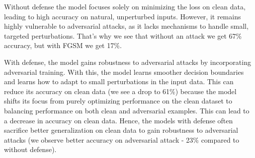 \documentclass{article}
\begin{document}

Without defense the model focuses solely on minimizing the loss on clean data, leading to high accuracy on natural,
unperturbed inputs. However, it remains highly vulnerable to adversarial attacks, as it lacks mechanisms to handle small, targeted perturbations. That's why we see that without an attack we get 67\% accuracy, but with FGSM we get 17\%.

With defense, the model gains robustness to adversarial attacks by incorporating adversarial training. With this,
the model learns smoother decision boundaries and learns how to adapt to small perturbations in the input data. This
can reduce its accuracy on clean data (we see a drop to 61\%) because the model shifts its focus from purely optimizing performance on the clean dataset to balancing performance on both clean and adversarial examples. This can lead to a decrease in accuracy on clean data. Hence, the models with defense often sacrifice better generalization on clean data to gain robustness to adversarial attacks (we observe better accuracy on adversarial attack - 23\% compared to without defense).
\end{document}
